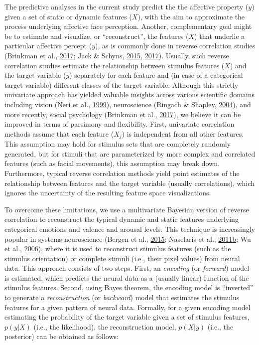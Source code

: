 \documentclass[11pt,american,]{memoir} %
\begin{document}
The predictive analyses in the current study predict the the affective property (\(y\)) given a set of static or dynamic features (\(X\)), with the aim to approximate the process underlying affective face perception. Another, complementary goal might be to estimate and visualize, or ``reconstruct'', the features (\(X\)) that underlie a particular affective percept (\(y\)), as is commonly done in reverse correlation studies (Brinkman et al., \protect\hyperlink{ref-Brinkman2017-hg}{2017}; Jack \& Schyns, \protect\hyperlink{ref-Jack2015-sh}{2015}, \protect\hyperlink{ref-Jack2017-gt}{2017}). Usually, such reverse correlation studies estimate the relationship between stimulus features (\(X\)) and the target variable (\(y\)) separately for each feature and (in case of a categorical target variable) different classes of the target variable. Although this strictly univariate approach has yielded valuable insights across various scientific domains including vision (Neri et al., \protect\hyperlink{ref-Neri1999-rj}{1999}), neuroscience (Ringach \& Shapley, \protect\hyperlink{ref-Ringach2004-nn}{2004}), and more recently, social psychology (Brinkman et al., \protect\hyperlink{ref-Brinkman2017-hg}{2017}), we believe it can be improved in terms of parsimony and flexibility. First, univariate correlation methods assume that each feature (\(X_{j}\)) is independent from all other features. This assumption may hold for stimulus sets that are completely randomly generated, but for stimuli that are parameterized by more complex and correlated features (such as facial movements), this assumption may break down. Furthermore, typical reverse correlation methods yield point estimates of the relationship between features and the target variable (usually correlations), which ignores the uncertainty of the resulting feature space visualizations.

To overcome these limitations, we use a multivariate Bayesian version of reverse correlation to reconstruct the typical dynamic and static features underlying categorical emotions and valence and arousal levels. This technique is increasingly popular in systems neuroscience (Bergen et al., \protect\hyperlink{ref-Van_Bergen2015-kl}{2015}; Naselaris et al., \protect\hyperlink{ref-Naselaris2011-oh}{2011}\protect\hyperlink{ref-Naselaris2011-oh}{b}; Wu et al., \protect\hyperlink{ref-Wu2006-qs}{2006}), where it is used to reconstruct stimulus features (such as the stimulus orientation) or complete stimuli (i.e., their pixel values) from neural data. This approach consists of two steps. First, an \emph{encoding} (or \emph{forward}) model is estimated, which predicts the neural data as a (usually linear) function of the stimulus features. Second, using Bayes theorem, the encoding model is ``inverted'' to generate a \emph{reconstruction} (or \emph{backward}) model that estimates the stimulus features for a given pattern of neural data. Formally, for a given encoding model estimating the probability of the target variable given a set of stimulus features, \(p(y | X)\) (i.e., the likelihood), the reconstruction model, \(p(X | y)\) (i.e., the posterior) can be obtained as follows:
\end{document}
